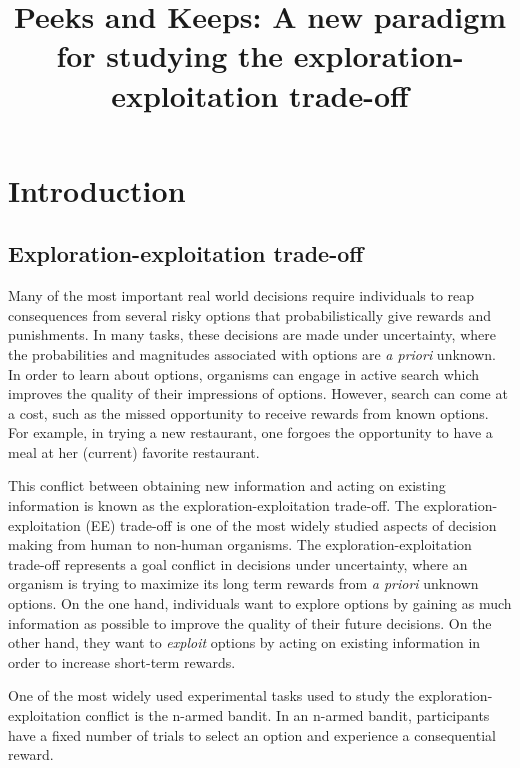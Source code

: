 \documentclass[a4paper,doc,natbib,floatsintext]{apa6}\usepackage[]{graphicx}\usepackage[]{color}
\title{Peeks and Keeps: A new paradigm for studying the exploration-exploitation trade-off}
\begin{document}



\maketitle

\section*{Introduction}

\subsection{Exploration-exploitation trade-off}

Many of the most important real world decisions require individuals to reap consequences from several risky options that probabilistically give rewards and punishments. In many tasks, these decisions are made under uncertainty, where the probabilities and magnitudes associated with options are \textit{a priori} unknown. In order to learn about options, organisms can engage in active search which improves the quality of their impressions of options. However, search can come at a cost, such as the missed opportunity to receive rewards from known options. For example, in trying a new restaurant, one forgoes the opportunity to have a meal at her (current) favorite restaurant.

This conflict between obtaining new information and acting on existing information is known as the exploration-exploitation trade-off. The exploration-exploitation (EE) trade-off is one of the most widely studied aspects of decision making from human to non-human organisms. The exploration-exploitation trade-off represents a goal conflict in decisions under uncertainty, where an organism is trying to maximize its long term rewards from \textit{a priori} unknown options. On the one hand, individuals want to explore options by gaining as much information as possible to improve the quality of their future decisions. On the other hand, they want to \textit{exploit} options by acting on existing information in order to increase short-term rewards.

One of the most widely used experimental tasks used to study the exploration-exploitation conflict is the n-armed bandit. In an n-armed bandit, participants have a fixed number of trials to select an option and experience a consequential reward.
\end{document}
